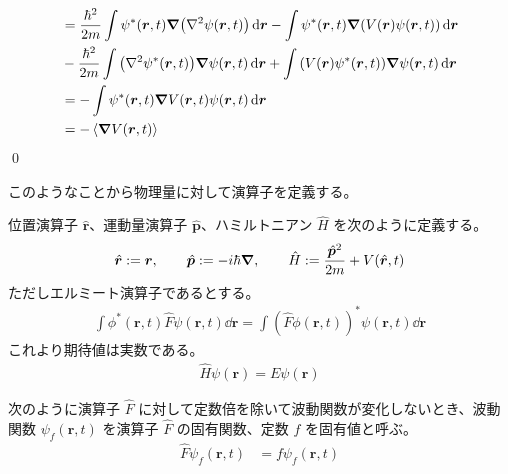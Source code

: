 \documentclass[uplatex,dvipdfmx,a4paper,11pt]{jlreq}
\makeatletter
\newcommand{\rr}{\bm{r}}
\newcommand{\pp}{\bm{p}}
\numberwithin{equation}{section}
\theoremstyle{definition}
\renewenvironment{proof}[1][\proofname]{\par
  \normalfont
  \topsep6\p@\@plus6\p@ \trivlist
  \item[\hskip\labelsep{\bfseries #1}\@addpunct{\bfseries}]\ignorespaces\quad\par
}{%
  \qed\endtrivlist\@endpefalse
}
\renewcommand\proofname{証明}
\makeatother
\begin{document}
\begin{proof}
\begin{align}
                         & = \frac{\hbar^2}{2m}\int\psi^*(\rr, t)\vnabla\qty(\nabla^2\psi(\rr, t))\dd{\rr} - \int\psi^*(\rr, t)\vnabla\qty(V(\rr)\psi(\rr, t))\dd{\rr}                                                      \\
                         & - \frac{\hbar^2}{2m}\int\qty(\nabla^2\psi^*(\rr, t))\vnabla\psi(\rr, t)\dd{\rr} + \int\qty(V(\rr)\psi^*(\rr, t))\vnabla\psi(\rr, t)\dd{\rr}                                                      \\
                         & = - \int\psi^*(\rr, t)\vnabla V(\rr, t)\psi(\rr, t)\dd{\rr}                                                                                                                                      \\
                         & = - \ev{\vnabla V(\rr, t)}
  \end{align}
\end{proof}

このようなことから物理量に対して演算子を定義する。
\begin{definition}
  位置演算子 $\hat{\rr}$、運動量演算子 $\hat{\pp}$、ハミルトニアン $\hat{H}$ を次のように定義する。
  \begin{align}
    \hat{\rr} := \rr, \qquad \hat{\pp} := -i\hbar\vnabla, \qquad \hat{H} := \frac{\hat{\pp}^2}{2m} + V(\hat{\rr}, t)
  \end{align}
  ただしエルミート演算子であるとする。
  \begin{align}
    \int\phi^*(\rr, t)\hat{F}\psi(\rr, t)\dd{\rr} = \int(\hat{F}\phi(\rr, t))^*\psi(\rr, t)\dd{\rr}
  \end{align}
  これより期待値は実数である。
  \begin{align}
    \hat{H}\psi(\rr) = E\psi(\rr)
  \end{align}
\end{definition}

\begin{definition}
  次のように演算子 $\hat{F}$ に対して定数倍を除いて波動関数が変化しないとき、波動関数 $\psi_f(\rr, t)$ を演算子 $\hat{F}$ の固有関数、定数 $f$ を固有値と呼ぶ。
  \begin{align}
    \hat{F}\psi_f(\rr, t) & = f\psi_f(\rr, t)
  \end{align}
\end{definition}
\end{document}
